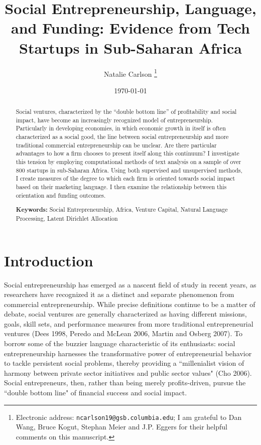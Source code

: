 \documentclass[12pt]{article}
\begin{document}
\title{Social Entrepreneurship, Language, and Funding: Evidence from Tech Startups in Sub-Saharan Africa}

\author{Natalie Carlson%
\thanks{Electronic address: \texttt{ncarlson19@gsb.columbia.edu}; I am grateful to Dan Wang, Bruce Kogut, Stephan Meier and J.P. Eggers for their helpful comments on this manuscript.}}

\date{\today}

\maketitle

\begin{abstract}
Social ventures, characterized by the ``double bottom line'' of profitability and social impact, have become an increasingly recognized model of entrepreneurship. Particularly in developing economies, in which economic growth in itself is often characterized as a social good, the line between social entrepreneurship and more traditional commercial entrepreneurship can be unclear. Are there particular advantages to how a firm chooses to present itself along this continuum? I investigate this tension by employing computational methods of text analysis on a sample of over 800 startups in sub-Saharan Africa. Using both supervised and unsupervised methods, I create measures of the degree to which each firm is oriented towards social impact based on their marketing language. I then examine the relationship between this orientation and funding outcomes.

\smallskip
\noindent \textbf{Keywords:} Social Entrepreneurship, Africa, Venture Capital, Natural Language Processing, Latent Dirichlet Allocation 

\end{abstract}


\section{Introduction}


Social entrepreneurship has emerged as a nascent field of study in recent years, as researchers have recognized it as a distinct and separate phenomenon from commercial entrepreneurship. While precise definitions continue to be a matter of debate, social ventures are generally characterized as having different missions, goals, skill sets, and performance measures from more traditional entrepreneurial ventures (Dees 1998, Peredo and McLean 2006, Martin and Osberg 2007). To borrow some of the buzzier language characteristic of its enthusiasts: social entrepreneurship harnesses the transformative power of entrepreneurial behavior to tackle persistent social problems, thereby providing a ``millenialist vision of harmony between private sector initiatives and public sector values" (Cho 2006). Social entrepreneurs, then, rather than being merely profits-driven, pursue the ``double bottom line" of financial success and social impact. 
\end{document}
